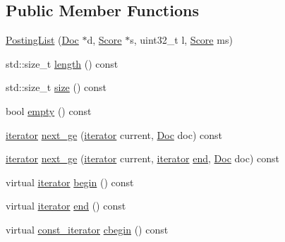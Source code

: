 \subsection*{Public Member Functions}
\begin{DoxyCompactItemize}
\item 
\mbox{\hyperlink{classbloodhound_1_1PostingList_a725f1df76c8278f1d927fff3ed4c496e}{Posting\+List}} (\mbox{\hyperlink{structbloodhound_1_1Doc}{Doc}} $\ast$d, \mbox{\hyperlink{structbloodhound_1_1Score}{Score}} $\ast$s, uint32\+\_\+t l, \mbox{\hyperlink{structbloodhound_1_1Score}{Score}} ms)
\item 
std\+::size\+\_\+t \mbox{\hyperlink{classbloodhound_1_1PostingList_a7af6f4e9fc277dd7c1dc73c2922ceacd}{length}} () const
\item 
std\+::size\+\_\+t \mbox{\hyperlink{classbloodhound_1_1PostingList_a440e43337385c66edb4e1c0568c74544}{size}} () const
\item 
bool \mbox{\hyperlink{classbloodhound_1_1PostingList_a28ec60331aec6acaa9c281d4d412bf26}{empty}} () const
\item 
\mbox{\hyperlink{structbloodhound_1_1PostingList_1_1iterator}{iterator}} \mbox{\hyperlink{classbloodhound_1_1PostingList_abd082192a0339062d318de73c95f1ee5}{next\+\_\+ge}} (\mbox{\hyperlink{structbloodhound_1_1PostingList_1_1iterator}{iterator}} current, \mbox{\hyperlink{structbloodhound_1_1Doc}{Doc}} doc) const
\item 
\mbox{\hyperlink{structbloodhound_1_1PostingList_1_1iterator}{iterator}} \mbox{\hyperlink{classbloodhound_1_1PostingList_aae5c35208d6fb36f611f952ba57add0f}{next\+\_\+ge}} (\mbox{\hyperlink{structbloodhound_1_1PostingList_1_1iterator}{iterator}} current, \mbox{\hyperlink{structbloodhound_1_1PostingList_1_1iterator}{iterator}} \mbox{\hyperlink{classbloodhound_1_1PostingList_a2e1f899bd04ae64e1318494d358ade94}{end}}, \mbox{\hyperlink{structbloodhound_1_1Doc}{Doc}} doc) const
\item 
virtual \mbox{\hyperlink{structbloodhound_1_1PostingList_1_1iterator}{iterator}} \mbox{\hyperlink{classbloodhound_1_1PostingList_a274f57f133cd6763e0d8cc3e00fa1be3}{begin}} () const
\item 
virtual \mbox{\hyperlink{structbloodhound_1_1PostingList_1_1iterator}{iterator}} \mbox{\hyperlink{classbloodhound_1_1PostingList_a2e1f899bd04ae64e1318494d358ade94}{end}} () const
\item 
virtual \mbox{\hyperlink{structbloodhound_1_1PostingList_1_1const__iterator}{const\+\_\+iterator}} \mbox{\hyperlink{classbloodhound_1_1PostingList_a44980317210bfe6c9f7d59dbea1cbd4a}{cbegin}} () const

\end{DoxyCompactItemize}

